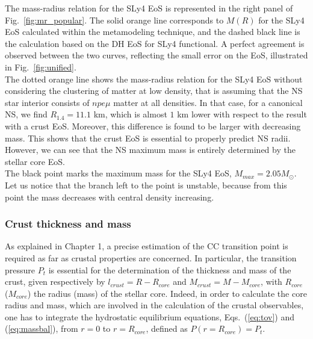 The mass-radius relation for the SLy4 EoS is represented in the right panel of
Fig.~\ref{fig:mr_popular}. The solid orange line corresponds to $M(R)$ for the 
SLy4 EoS calculated within the metamodeling technique, and the dashed 
black line is the calculation based on the DH EoS for SLy4 functional. A 
perfect agreement is observed between the two curves, reflecting the small 
error on the EoS, illustrated in Fig.~\ref{fig:unified}. \\
The dotted orange line shows the mass-radius relation for the SLy4 EoS without
considering the clustering of matter at low density, that is assuming that the
NS star interior consists of $npe\mu$ matter at all densities. In that case,
for a canonical NS, we find $R_{1.4} = 11.1$ km, which is almost $1$ km lower 
with respect to the result with a crust EoS. Moreover, this difference is found 
to be larger with decreasing mass. This shows that the crust EoS is essential 
to properly predict NS radii. However, we can see that the NS maximum mass is 
entirely determined by the stellar core EoS.\\
The black point marks the maximum mass for the SLy4 EoS, $M_{max} = 
2.05M_\odot$. Let us notice that the branch left to the point is unstable, 
because from this point the mass decreases with central density increasing.

\subsubsection{Crust thickness and mass}
As explained in Chapter 1, a precise estimation of the CC transition point is
required as far as crustal properties are concerned. In particular, the
transition pressure $P_t$ is essential for the determination of the thickness 
and mass of the crust, given respectively by $l_{crust}=R-R_{core}$ and
$M_{crust}=M-M_{core}$, with $R_{core}$ ($M_{core}$) the radius
(mass) of the stellar core. Indeed, in order to calculate the core radius and
mass, which are involved in the calculation of the crustal observables, one has 
to integrate the hydrostatic equilibrium equations, Eqs.~(\ref{eq:tov}) and 
(\ref{eq:massbal}), from $r=0$ to $r=R_{core}$, defined as $P(r=R_{core})=P_t$.

